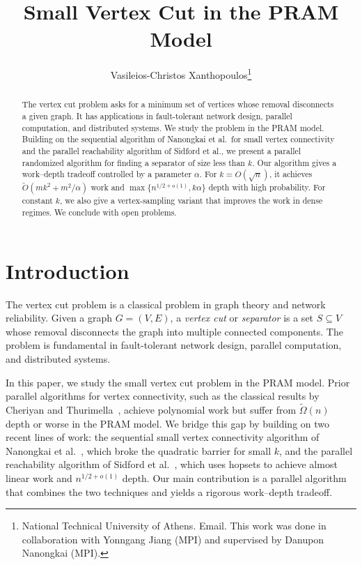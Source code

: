 \documentclass[11pt]{article}
\title{Small Vertex Cut in the PRAM Model}
\author{Vasileios-Christos Xanthopoulos\thanks{National Technical University of Athens. Email. This work was done in collaboration with Yonngang Jiang (MPI) and supervised by Danupon Nanongkai (MPI).}}
\date{}
\theoremstyle{remark}
\newcommand{\tildeO}{\widetilde{O}}
\begin{document}
\maketitle

\begin{abstract}
The vertex cut problem asks for a minimum set of vertices whose removal disconnects a given graph. It has applications in fault-tolerant network design, parallel computation, and distributed systems. We study the problem in the PRAM model. Building on the sequential algorithm of Nanongkai et al.\ for small vertex connectivity and the parallel reachability algorithm of Sidford et al., we present a parallel randomized algorithm for finding a separator of size less than \(k\). Our algorithm gives a work--depth tradeoff controlled by a parameter \(\alpha\). For \(k=O(\sqrt n)\), it achieves \(\tildeO(mk^2+m^2/\alpha)\) work and \(\max\{n^{1/2+o(1)},k\alpha\}\) depth with high probability. For constant \(k\), we also give a vertex-sampling variant that improves the work in dense regimes. We conclude with open problems.
\end{abstract}

\section{Introduction}

The vertex cut problem is a classical problem in graph theory and network reliability. Given a graph \(G=(V,E)\), a \emph{vertex cut} or \emph{separator} is a set \(S\subseteq V\) whose removal disconnects the graph into multiple connected components. The problem is fundamental in fault-tolerant network design, parallel computation, and distributed systems.

In this paper, we study the small vertex cut problem in the PRAM model. Prior parallel algorithms for vertex connectivity, such as the classical results by Cheriyan and Thurimella~\cite{cheriyan1993algorithms}, achieve polynomial work but suffer from \(\tilde{\Omega}(n)\) depth or worse in the PRAM model. We bridge this gap by building on two recent lines of work: the sequential small vertex connectivity algorithm of Nanongkai et al.~\cite{nanongkai2021breakingquadratictimesmall}, which broke the quadratic barrier for small \(k\), and the parallel reachability algorithm of Sidford et al.~\cite{Jambulapati2019ParallelRI}, which uses hopsets to achieve almost linear work and \(n^{1/2+o(1)}\) depth. Our main contribution is a parallel algorithm that combines the two techniques and yields a rigorous work--depth tradeoff.
\end{document}

